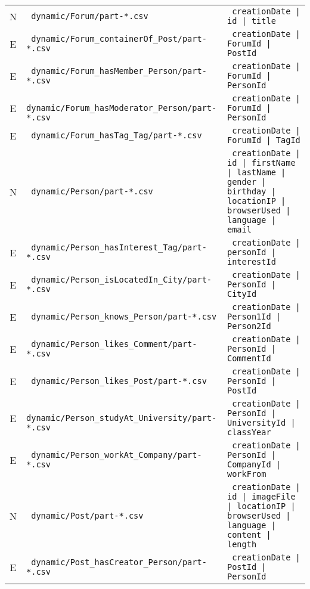 \begin{table}[htb]
\begin{tabularx}{\linewidth}{|>{\sffamily}c|>{\tt}l|>{\tt}X|}
        \hline
        N                    & dynamic/Forum/part-*.csv                            & creationDate | id | title \\
        E                    & dynamic/Forum\_containerOf\_Post/part-*.csv         & creationDate | ForumId | PostId \\
        E                    & dynamic/Forum\_hasMember\_Person/part-*.csv         & creationDate | ForumId | PersonId \\
        E                    & dynamic/Forum\_hasModerator\_Person/part-*.csv      & creationDate | ForumId | PersonId \\
        E                    & dynamic/Forum\_hasTag\_Tag/part-*.csv               & creationDate | ForumId | TagId \\
        \hline
        N                    & dynamic/Person/part-*.csv                           & creationDate | id | firstName | lastName | gender | birthday | locationIP | browserUsed | language | email \\
        E                    & dynamic/Person\_hasInterest\_Tag/part-*.csv         & creationDate | personId | interestId \\
        E                    & dynamic/Person\_isLocatedIn\_City/part-*.csv        & creationDate | PersonId | CityId \\
        E                    & dynamic/Person\_knows\_Person/part-*.csv            & creationDate | Person1Id | Person2Id \\
        E                    & dynamic/Person\_likes\_Comment/part-*.csv           & creationDate | PersonId | CommentId \\
        E                    & dynamic/Person\_likes\_Post/part-*.csv              & creationDate | PersonId | PostId \\
        E                    & dynamic/Person\_studyAt\_University/part-*.csv      & creationDate | PersonId | UniversityId | classYear \\
        E                    & dynamic/Person\_workAt\_Company/part-*.csv          & creationDate | PersonId | CompanyId | workFrom \\
        \hline
        N                    & dynamic/Post/part-*.csv                             & creationDate | id | imageFile | locationIP | browserUsed | language | content | length \\
        E                    & dynamic/Post\_hasCreator\_Person/part-*.csv         & creationDate | PostId | PersonId \\

\end{tabularx}
\end{table}

